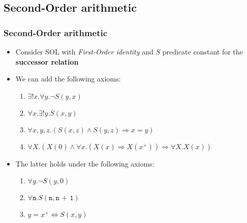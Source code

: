 \documentclass{beamer}
\begin{document}
            \subsection{Second-Order arithmetic}
                \begin{frame}
                    \frametitle{Second-Order arithmetic}
                    \begin{itemize}
                        \item Consider SOL with \textit{First-Order identity} and $ S $ predicate constant for the \textbf{successor relation}
                        \item We can add the following axioms:
                            \begin{enumerate}
                                \item $ \exists !x. \forall y. \neg S(y, x) $
                                \item $ \forall x. \exists !y. S(x, y) $
                                \item $ \forall x, y, z . (S(x, z) \wedge S(y, z) \Rightarrow x = y) $
                                \item $ \forall X.(X(0) \wedge \forall x. (X(x) \Rightarrow X(x^+)) \Rightarrow \forall X. X(x)) $
                            \end{enumerate}
                        \item The latter holds under the following axioms:
                            \begin{enumerate}[I]
                                \item $ \forall y. \neg S(y, 0) $
                                \item $ \forall \texttt{n}. S(\texttt{n}, \texttt{n + 1}) $
                                \item $ y = x^+ \Leftrightarrow S(x, y) $
                            \end{enumerate}
                    \end{itemize}
                \end{frame}
\end{document}
